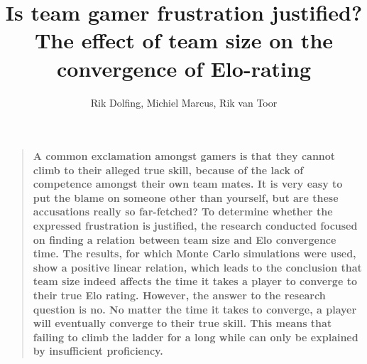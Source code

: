 \documentclass[12pt]{article}
\title{Is team gamer frustration justified? \\
	\large The effect of team size on the convergence of Elo-rating}
\author
{Rik Dolfing, Michiel Marcus, Rik van Toor}
\date{}
\newenvironment{sciabstract}{%
\begin{quote} \bf}
{\end{quote}}
\begin{document}
 


\baselineskip24pt


\maketitle 




\begin{sciabstract}
  A common exclamation amongst gamers is that they cannot climb to their alleged true skill, because of the lack of competence amongst their own team mates. It is very easy to put the blame on someone other than yourself, but are these accusations really so far-fetched? To determine whether the expressed frustration is justified, the research conducted focused on finding a relation between team size and Elo convergence time. The results, for which Monte Carlo simulations were used, show a positive linear relation, which leads to the conclusion that team size indeed affects the time it takes a player to converge to their true Elo rating. However, the answer to the research question is no. No matter the time it takes to converge, a player will eventually converge to their true skill. This means that failing to climb the ladder for a long while can only be explained by insufficient proficiency.
\end{sciabstract}



\clearpage
\end{document}
